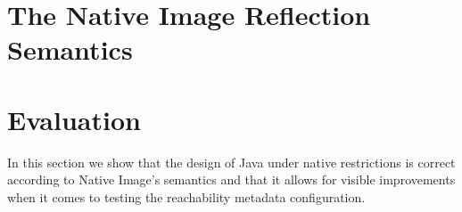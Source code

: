
\chapter{The Native Image Reflection Semantics}\label{native_image_specs}





\chapter{Evaluation}
In this section we show that the design of Java under native restrictions is correct according to Native Image's semantics and that it allows for visible improvements when it comes to testing the reachability metadata configuration.

